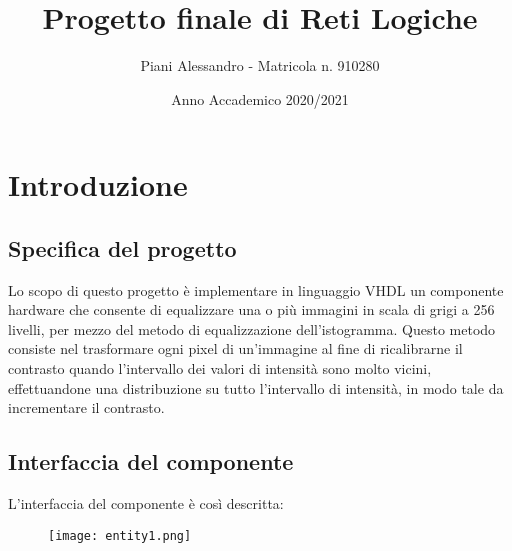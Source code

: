 \documentclass{article}
\title{Progetto finale di Reti Logiche}
\author{Piani Alessandro - Matricola n. 910280}
\date{Anno Accademico 2020/2021}
\begin{document}
\maketitle
\tableofcontents


\pagebreak
\section{Introduzione} \label{subsection-introduz}

\subsection{Specifica del progetto}
Lo scopo di questo progetto è implementare in linguaggio VHDL un componente hardware che consente di equalizzare una o più immagini in scala di grigi a 256 livelli, per mezzo del metodo di equalizzazione dell'istogramma. Questo metodo consiste nel trasformare ogni pixel di un'immagine al fine di ricalibrarne il contrasto quando l'intervallo dei valori di intensità sono molto vicini, effettuandone una distribuzione su tutto l'intervallo di intensità, in modo tale da incrementare il contrasto.

\subsection{Interfaccia del componente}
L'interfaccia del componente è così descritta:

\begin{figure}[H]
	\texttt{[image: entity1.png]}
\end{figure}
\end{document}
